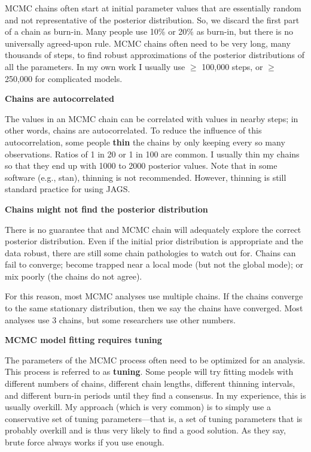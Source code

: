 \documentclass[
  13,
  letterpaper,
]{report}
\begin{document}
MCMC chains often start at initial parameter values that are essentially
random and not representative of the posterior distribution. So, we
discard the first part of a chain as burn-in. Many people use 10\% or
20\% as burn-in, but there is no universally agreed-upon rule. MCMC
chains often need to be very long, many thousands of steps, to find
robust approximations of the posterior distributions of all the
parameters. In my own work I usually use \(\geq\) 100,000 steps, or
\(\geq\) 250,000 for complicated models.

\textbf{Chains are autocorrelated}

The values in an MCMC chain can be correlated with values in nearby
steps; in other words, chains are autocorrelated. To reduce the
influence of this autocorrelation, some people \textbf{thin} the chains
by only keeping every so many observations. Ratios of 1 in 20 or 1 in
100 are common. I usually thin my chains so that they end up with 1000
to 2000 posterior values. Note that in some software (e.g., stan),
thinning is not recommended. However, thinning is still standard
practice for using JAGS.

\textbf{Chains might not find the posterior distribution}

There is no guarantee that and MCMC chain will adequately explore the
correct posterior distribution. Even if the initial prior distribution
is appropriate and the data robust, there are still some chain
pathologies to watch out for. Chains can fail to converge; become
trapped near a local mode (but not the global mode); or mix poorly (the
chains do not agree).

For this reason, most MCMC analyses use multiple chains. If the chains
converge to the same stationary distribution, then we say the chains
have converged. Most analyses use 3 chains, but some researchers use
other numbers.

\textbf{MCMC model fitting requires tuning}

The parameters of the MCMC process often need to be optimized for an
analysis. This process is referred to as \textbf{tuning}. Some people
will try fitting models with different numbers of chains, different
chain lengths, different thinning intervals, and different burn-in
periods until they find a consensus. In my experience, this is usually
overkill. My approach (which is very common) is to simply use a
conservative set of tuning parameters---that is, a set of tuning
parameters that is probably overkill and is thus very likely to find a
good solution. As they say, brute force always works if you use enough.
\end{document}
